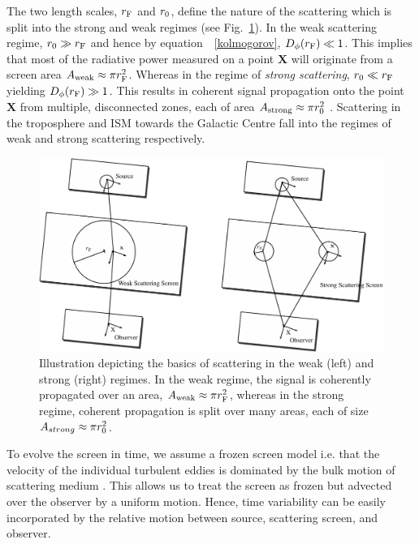 The two length scales, $r_{\rm F}$ and $r_{\rm 0}$, define the nature of the scattering which is split into the strong and weak regimes (see Fig.~\ref{fig:scatter}). In the weak scattering regime, $ r_{\rm 0} \gg r_{\rm F}$ and hence by equation\ ~\ref{kolmogorov}, $D_{\phi}(r_{\rm F}) \ll 1$. This implies that most of the radiative power measured on a point $\bm{X}$ will originate from a screen area $A_{\rm weak} \approx \pi r_{\rm F}^2$. Whereas in the regime of \emph{strong scattering}, $ r_{\rm 0} \ll r_{\rm F}$ yielding  $D_{\phi}(r_{\rm F}) \gg 1$. This  results in coherent signal propagation onto the point $\bm{X}$ from multiple, disconnected zones, each of area $A_{\rm strong} \approx \pi r_{\rm 0}^2$ \citep{Narayan_1992}. Scattering in the troposphere and ISM towards the Galactic Centre fall into the regimes of weak and strong scattering respectively.

\begin{figure}
\begin{center}
\includegraphics[width=1.\columnwidth]{Images/scatter.pdf}
\caption[Illustration depicting the basics of scattering in the weak and strong regimes.]{Illustration depicting the basics of scattering in the weak (left) and strong (right) regimes. In the weak regime, the signal is coherently propagated over an area, $A_{\rm weak} \approx \pi r_{\rm F}^2$, whereas in the strong regime, coherent propagation is split over many areas, each of size $A_{strong} \approx \pi r_{\rm 0}^2$. \label{fig:scatter}
}
\end{center}
\end{figure}

To evolve the screen in time, we assume a frozen screen model i.e. that the velocity of the individual turbulent eddies is dominated by the bulk motion of scattering medium \citep[e.g.][]{Lay_1997}. This allows us to treat the screen as frozen but advected over the observer by a uniform motion. Hence, time variability can be easily incorporated by the relative motion between source, scattering screen, and observer.

